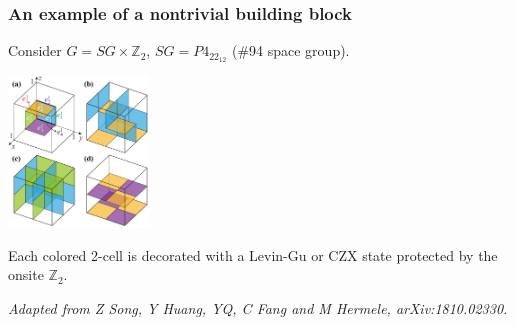 \documentclass[xcolor=table, aspectratio=43,ignorenonframetext]{beamer}
\newcommand{\uone}{\text U(1)}
\begin{document}


\begin{frame}
\frametitle{An example of a nontrivial building block}
Consider $G=SG\times\mathbb Z_2$, $SG=P4_22_12$ (\#94 space group).
\begin{center}
\includegraphics[height=4cm]{../spspt/blocks}
\end{center}
Each colored 2-cell is decorated with a Levin-Gu or CZX state protected by the onsite $\mathbb Z_2$.

\emph{\small Adapted from Z Song, Y Huang, YQ, C Fang and M Hermele, arXiv:1810.02330.}
\end{frame}
\end{document}

